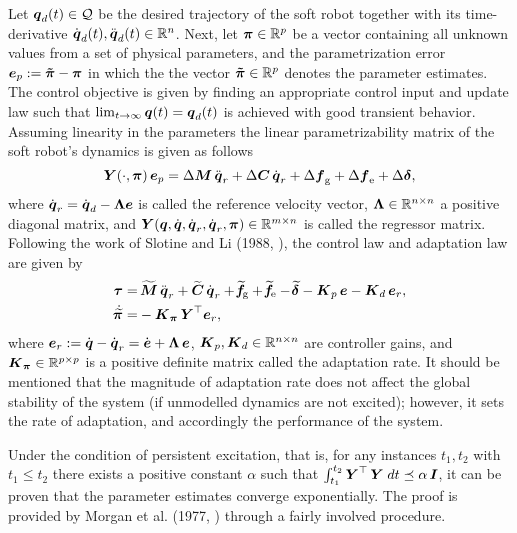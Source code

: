 Let ${\boldsymbol{q}}_d(t) \in \mathcal{Q}$ be the desired trajectory of the soft robot together with its time-derivative ${\dot{\boldsymbol{q}}}_d(t),{\ddot{\boldsymbol{q}}}_d(t)\in {\mathbb{R}^n}$. Next, let $\boldsymbol{\pi} \in \mathbb{R}^p$ be a vector containing all unknown values from a set of physical parameters, and the parametrization error $\boldsymbol{e}_{p} := \boldsymbol{\tilde{\boldsymbol{\pi}}} - \boldsymbol{\pi}$ in which the the vector $\boldsymbol{\tilde{\pi}} \in \mathbb{R}^p$ denotes the parameter estimates. The control objective is given by finding an appropriate control input and update law such that
$\lim_{t\to \infty} {\boldsymbol{q}}(t) = {\boldsymbol{q}}_d(t)$ is achieved with good transient behavior. Assuming linearity in the parameters
the linear parametrizability matrix of the soft robot's dynamics is given as follows
%
\begin{equation}
\boldsymbol{Y}(\cdot,\boldsymbol{\pi})\,{\boldsymbol{e}_p} = \Delta \boldsymbol{M}\,{\ddot{\boldsymbol{q}}}_r + \Delta \boldsymbol{C}\,{\dot{\boldsymbol{q}}}_r + \Delta \boldsymbol{f}_{\scriptstyle\textrm{g}} +  \Delta\boldsymbol{f}_{\scriptstyle\textrm{e}} +  \Delta \boldsymbol{\delta},\label{eq:regress}
\end{equation}
%
where ${\dot{\boldsymbol{q}}}_r = {\dot{\boldsymbol{q}}}_d - \boldsymbol{\Lambda} {\boldsymbol{e}} $ is called the reference velocity vector, $\boldsymbol{\Lambda} \in \mathbb{R}^{n \times n}$ a positive diagonal matrix, and $\boldsymbol{Y}({\boldsymbol{q}},{\dot{\boldsymbol{q}}},{\dot{\boldsymbol{q}}}_r,{\dot{\boldsymbol{q}}}_r,\boldsymbol{\pi}) \in \mathbb{R}^{m\times n}$ is called the regressor matrix.
Following the work of Slotine and Li (1988, \cite{Slotine1988}), the control law and adaptation law are given by
%
\begin{align}
\boldsymbol{\tau} = &\, \widetilde{\boldsymbol{M}}\,{\ddot{\boldsymbol{q}}}_r + \widetilde{\boldsymbol{C}}\, {\dot{\boldsymbol{q}}}_r + \widetilde{\!\boldsymbol{f}}\!_{\scriptstyle\textrm{g}} +  \widetilde{\!\boldsymbol{f}}\!_{\scriptstyle\textrm{e}} - \widetilde{\!\boldsymbol{\delta}} - \boldsymbol{K}_p \, \boldsymbol{e} - \boldsymbol{K}_d\, \boldsymbol{e}_r,  \label{eq:C2:tau} \\
\dot{\widetilde{\!\boldsymbol{\pi}}} =& - \boldsymbol{K}_{\boldsymbol{\pi}}\,\boldsymbol{Y}^\top\boldsymbol{e}_r,  \label{eq:C2:update}
\end{align}
%
where $\boldsymbol{e}_r := {\dot{\boldsymbol{q}}} - {\dot{\boldsymbol{q}}}_r = \dot{\boldsymbol{e}} + \boldsymbol{\Lambda}\,\boldsymbol{e}$, $\boldsymbol{K}_p, \boldsymbol{K}_d \in \mathbb{R}^{n\times n}$ are controller gains, and $\boldsymbol{K}_{\boldsymbol{\pi}} \in \mathbb{R}^{p\times p}$ is a positive definite matrix called the adaptation rate. It should be mentioned that the magnitude of adaptation rate does not affect the global stability of the system (if unmodelled dynamics are not excited); however, it sets the rate of adaptation, and accordingly the performance of the system.

\begin{rmk}
Under the condition of persistent excitation, that is, for any instances $t_1,t_2$ with $t_1\le t_2$ there exists a positive constant $\alpha$ such that $\int_{t_1}^{t_2} \boldsymbol{Y}^\top\,\boldsymbol{Y} \;dt \preceq \alpha\,\boldsymbol{I}$, it can be proven that the parameter estimates converge exponentially. The proof is provided by Morgan et al. (1977, \cite{Morgan1977}) through a fairly involved procedure.
\end{rmk}
%
